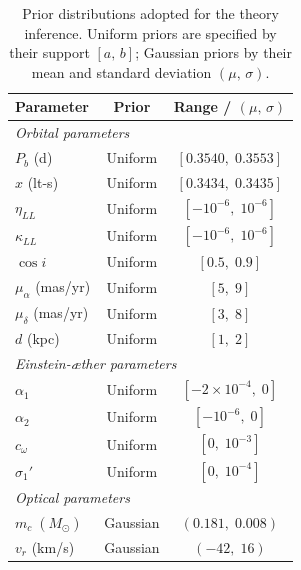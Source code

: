 \documentclass[
    floats,
    floatfix,
    amssymb,
    prd,
    twocolumn,
    superscriptaddress,
    nofootinbib,
    unicode,
    colorlinks=true,
    linktocpage=true
]{revtex4-2}
\begin{document}
\begin{table}[htbp]
\centering
\begin{tabular}{lcc}
\hline\hline
Parameter & Prior & Range / $(\mu,\,\sigma)$ \\
\hline
\multicolumn{3}{l}{\textit{Orbital parameters}} \\
$P_b$ (d)            & Uniform   & $[0.3540,\; 0.3553]$ \\
$x$ (lt-s)           & Uniform   & $[0.3434,\; 0.3435]$ \\
$\eta_{LL}$         & Uniform   & $[-10^{-6},\; 10^{-6}]$ \\
$\kappa_{LL}$         & Uniform   & $[-10^{-6},\; 10^{-6}]$ \\
$\cos i$             & Uniform   & $[0.5,\; 0.9]$ \\
$\mu_\alpha$ (mas/yr)& Uniform   & $[5,\; 9]$ \\
$\mu_\delta$ (mas/yr)& Uniform   & $[3,\; 8]$ \\
$d$ (kpc)            & Uniform  & $[1,\; 2]$ \\
\hline
\multicolumn{3}{l}{\textit{Einstein-\ae ther parameters}} \\
$\alpha_1$     & Uniform   & $[-2\times10^{-4},\; 0]$ \\
$\alpha_2$     & Uniform   & $[-10^{-6},\; 0]$ \\
$c_\omega$           & Uniform   & $[0,\; 10^{-3}]$ \\
$\sigma_1'$               & Uniform   & $[0,\; 10^{-4}]$ \\
\hline
\multicolumn{3}{l}{\textit{Optical parameters}} \\
$m_c\;(M_\odot)$     & Gaussian  & $(0.181,\; 0.008)$ \\
$v_r$ (km/s)         & Gaussian  & $(-42,\; 16)$ \\
\hline\hline
\end{tabular}
\caption{Prior distributions adopted for the theory inference.
Uniform priors are specified by their support $[a,\, b]$;
Gaussian priors by their mean and standard deviation $(\mu,\,\sigma)$.}
\label{tab:priors_theory}
\end{table}
\end{document}
